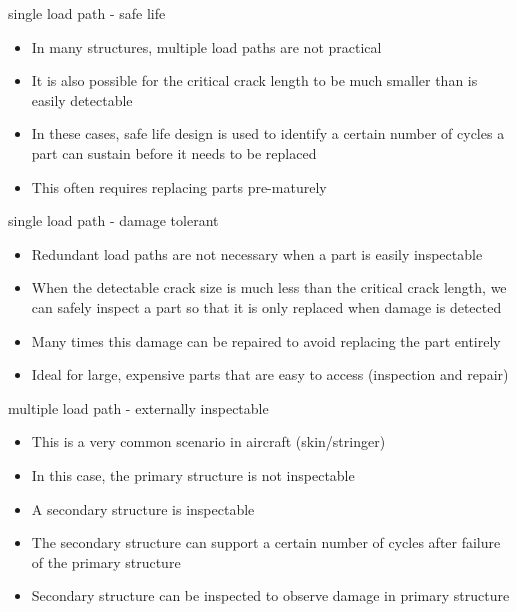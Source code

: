 \documentclass[10pt]{beamer}
\begin{document}
	\begin{frame}{single load path - safe life}
		\begin{itemize}[<+->]
			\item In many structures, multiple load paths are not practical
			\item It is also possible for the critical crack length to be much smaller than is easily detectable
			\item In these cases, safe life design is used to identify a certain number of cycles a part can sustain before it needs to be replaced
			\item This often requires replacing parts pre-maturely
		\end{itemize}
	\end{frame}
	
	\begin{frame}{single load path - damage tolerant}
		\begin{itemize}[<+->]
			\item Redundant load paths are not necessary when a part is easily inspectable
			\item When the detectable crack size is much less than the critical crack length, we can safely inspect a part so that it is only replaced when damage is detected
			\item Many times this damage can be repaired to avoid replacing the part entirely
			\item Ideal for large, expensive parts that are easy to access (inspection and repair)
		\end{itemize}
	\end{frame}
	
	\begin{frame}{multiple load path - externally inspectable}
		\begin{itemize}[<+->]
			\item This is a very common scenario in aircraft (skin/stringer)
			\item In this case, the primary structure is not inspectable
			\item A secondary structure is inspectable
			\item The secondary structure can support a certain number of cycles after failure of the primary structure
			\item Secondary structure can be inspected to observe damage in primary structure
		\end{itemize}
	\end{frame}
	
\end{document}
